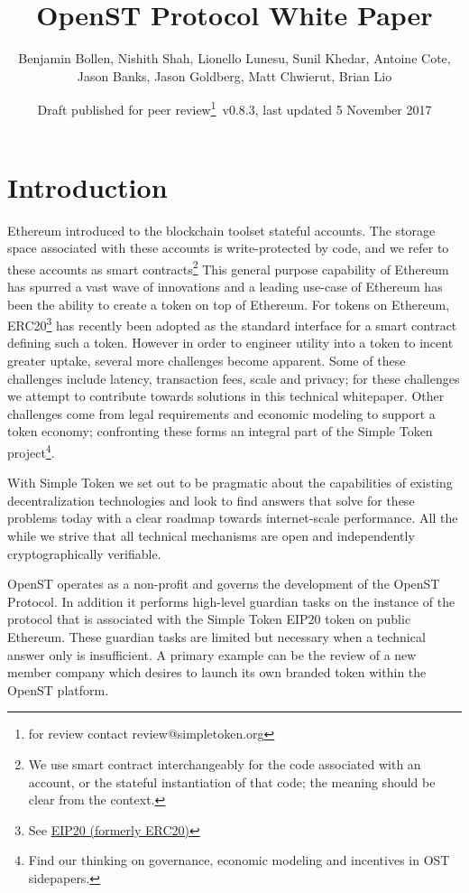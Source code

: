 \documentclass[12pt,a4paper, twocolumn]{article}
\title{{\sc OpenST Protocol White Paper}}
\author{Benjamin Bollen, Nishith Shah, Lionello Lunesu, Sunil Khedar, Antoine Cote,\\ Jason Banks, Jason Goldberg, Matt Chwierut, Brian Lio}
\date{Draft published for peer review\footnote{for review contact review@simpletoken.org}\, v0.8.3, last updated 5 November 2017}
\begin{document}
\maketitle

\section{Introduction}
Ethereum introduced to the blockchain toolset stateful accounts. The storage space associated with these accounts is write-protected by code, and we refer to these accounts as smart contracts\footnote{We use smart contract interchangeably for the code associated with an account, or the stateful instantiation of that code; the meaning should be clear from the context.} This general purpose capability of Ethereum has spurred a vast wave of innovations and a leading use-case of Ethereum has been the ability to create a token on top of Ethereum. For tokens on Ethereum, ERC20\footnote{See \href{https://github.com/ethereum/EIPs/blob/master/EIPS/eip-20.md}{EIP20 (formerly ERC20)}} has recently been adopted as the standard interface for a smart contract defining such a token.  However in order to engineer utility into a token to incent greater uptake, several more challenges become apparent.  Some of these challenges include latency, transaction fees, scale and privacy; for these challenges we attempt to contribute towards solutions in this technical whitepaper.  Other challenges come from legal requirements and economic modeling to support a token economy; confronting these forms an integral part of the Simple Token project\footnote{Find our thinking on governance, economic modeling and incentives in OST sidepapers.}. \par
With Simple Token we set out to be pragmatic about the capabilities of existing decentralization technologies and look to find answers that solve for these problems today with a clear roadmap towards internet-scale performance.  All the while we strive that all technical mechanisms are open and independently cryptographically verifiable. \par
OpenST operates as a non-profit and governs the development of the OpenST Protocol.  In addition it performs high-level guardian tasks on the instance of the protocol that is associated with the Simple Token EIP20 token on public Ethereum.  These guardian tasks are limited but necessary when a technical answer only is insufficient.  A primary example can be the review of a new member company which desires to launch its own branded token within the OpenST platform. \par
\end{document}
